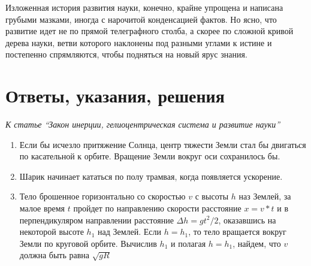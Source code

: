 \documentclass[twocolumn,10pt]{article}
\begin{document}
Изложенная история развития науки, конечно, крайне упрощена и написана грубыми мазками, иногда с нарочитой конденсацией фактов. Но ясно, что развитие идет не по прямой телеграфного столба, а скорее по сложной кривой дерева науки, ветви которого наклонены под разными углами к истине и постепенно спрямляются, чтобы подняться на новый ярус знания.

\section*{Ответы, указания, решения}

\emph{К статье ``Закон инерции, гелиоцентрическая система и развитие науки''}
\begin{small}
\begin{enumerate}
\item Если бы исчезло притяжение Солнца, центр тяжести Земли стал бы двигаться по касательной к орбите. Вращение Земли вокруг оси сохранилось бы.
\item Шарик начинает кататься по полу трамвая, когда появляется ускорение.
\item Тело брошенное горизонтально со скоростью $v$ с высоты $h$ наз Землей, за малое время $t$ пройдет по направлению скорости расстояние $x=v*t$ и в перпендикуляром направлении расстояние $\Delta h=gt^2/2$, оказавшись на некоторой высоте $h_1$ над Землей. Если $h=h_1$, то тело вращается вокруг Земли по круговой орбите. Вычислив $h_1$ и полагая $h=h_1$, найдем, что $v$ должна быть равна $\sqrt{gR}$
\end{enumerate}
\end{small}

\end{document}
